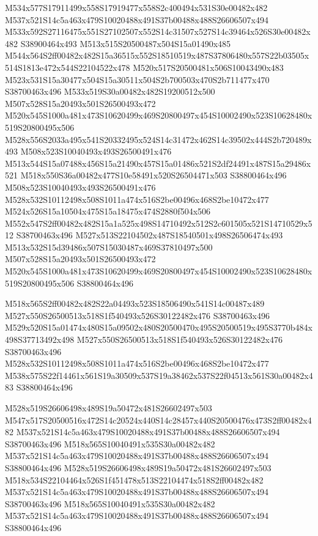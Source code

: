 \documentclass{article}
\begin{document}
\begin{multicols}{2}
M534x577S17911499x558S17919477x558S2c400494x531S30e00482x482 M537x521S14c5a463x479S10020488x491S37b00488x488S26606507x494 M533x592S27116475x551S27102507x552S14c31507x527S14c39464x526S30e00482x482 S38900464x493 M513x515S20500487x504S15a01490x485 M544x564S2ff00482x482S15a36515x552S18510519x487S37806480x557S22b03505x514S1813e472x544S22104522x478 M520x517S20500481x506S10043490x483 M523x531S15a30477x504S15a30511x504S2b700503x470S2b711477x470 S38700463x496 M533x519S30a00482x482S19200512x500 M507x528S15a20493x501S26500493x472 M520x545S1000a481x473S10620499x469S20800497x454S10002490x523S10628480x519S20800495x506 M528x556S2033a495x541S20332495x524S14c31472x462S14c39502x444S2b720489x493 M508x523S10040493x493S26500491x476 M513x544S15a07488x456S15a21490x457S15a01486x521S2df24491x487S15a29486x521 M518x550S36a00482x477S10e58491x520S26504471x503 S38800464x496 M508x523S10040493x493S26500491x476 M528x532S10112498x508S1011a474x516S2be00496x468S2be10472x477 M524x526S15a10504x475S15a18475x474S2880f504x506 M552x547S2ff00482x482S15a1a525x498S14710492x512S2c601505x521S14710529x512 S38700463x496 M527x513S22104502x487S18540501x498S26506474x493 M513x532S15d39486x507S15030487x469S37810497x500 M507x528S15a20493x501S26500493x472 M520x545S1000a481x473S10620499x469S20800497x454S10002490x523S10628480x519S20800495x506 S38800464x496

M518x565S2ff00482x482S22a04493x523S18506490x541S14c00487x489 M527x550S26500513x518S1f540493x526S30122482x476 S38700463x496 M529x520S15a01474x480S15a09502x480S20500470x495S20500519x495S3770b484x498S37713492x498 M527x550S26500513x518S1f540493x526S30122482x476 S38700463x496 M528x532S10112498x508S1011a474x516S2be00496x468S2be10472x477 M538x575S22f14461x561S19a30509x537S19a38462x537S22f04513x561S30a00482x483 S38800464x496

M528x519S26606498x489S19a50472x481S26602497x503 M547x517S20500516x472S14c20524x440S14c28457x440S20500476x473S2ff00482x482 M537x521S14c5a463x479S10020488x491S37b00488x488S26606507x494 S38700463x496 M518x565S10040491x535S30a00482x482 M537x521S14c5a463x479S10020488x491S37b00488x488S26606507x494 S38800464x496 M528x519S26606498x489S19a50472x481S26602497x503 M518x534S22104464x526S1f451478x513S22104474x518S2ff00482x482 M537x521S14c5a463x479S10020488x491S37b00488x488S26606507x494 S38700463x496 M518x565S10040491x535S30a00482x482 M537x521S14c5a463x479S10020488x491S37b00488x488S26606507x494 S38800464x496


\end{multicols}
\end{document}
